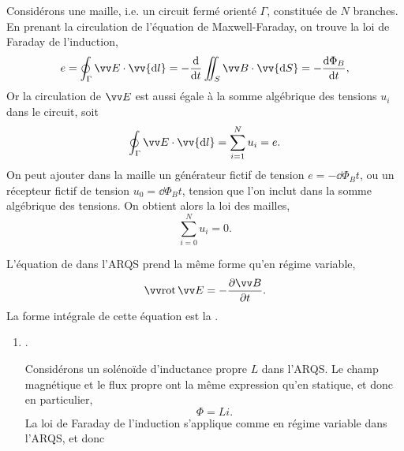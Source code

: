 \documentclass[12pt,fancy]{cours}
\begin{document}
\begin{enumerate}
Considérons une maille, i.e. un circuit fermé orienté $\Gamma$, constituée de $N$ branches.
En prenant la circulation de l’équation de Maxwell-Faraday, on trouve la loi de Faraday de l’induction,
\begin{equation}
  e = \oint_{\Gamma}\E\cdot\vv{\d l} = -\frac{\d}{\d t}\iint_{S}\B\cdot\vv{\d S} = -\frac{\d \Phi_B}{\d t},
\end{equation}
Or la circulation de $\E$ est aussi égale à la somme algébrique des tensions $u_i$ dans le circuit, soit
\begin{equation}
  \oint_{\Gamma}\E\cdot\vv{\d l} = \sum_{i=1}^N u_i = e.
\end{equation}
On peut ajouter dans la maille un générateur fictif de tension $e = - \dd{\Phi_B}{t}$, ou un récepteur fictif de tension $u_0 = \dd{\Phi_B}{t}$, tension que l’on inclut dans la somme algébrique des tensions. On obtient alors la loi des mailles,
\begin{equation}
  \sum_{i=0}^N u_i = 0.
\end{equation}

\begin{prop}\label{prop:}
  L’équation de  dans l’ARQS prend la même forme qu’en régime variable,
$$
\rot \E = - \dr{\B}{t}.
$$
La forme intégrale de cette équation est la .
\end{prop}

\end{enumerate}


\begin{enumerate}
  \item {}.
  
  Considérons un solénoïde d’inductance propre $L$ dans l’ARQS. Le champ magnétique et le flux propre ont la même expression qu’en statique, et donc en particulier, 
  \begin{equation}
  \Phi = L i.
  \end{equation}
  La loi de Faraday de l’induction s’applique comme en régime variable dans l’ARQS, et donc
\end{enumerate}
\end{document}
